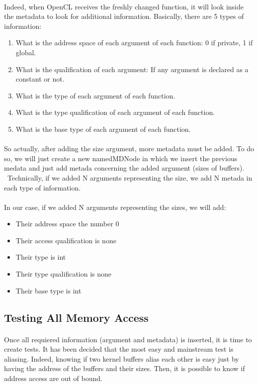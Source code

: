 \documentclass{article}
\begin{document}
\begin{itemize}
\paragraph{}
Indeed, when OpenCL receives the freshly changed function, it will look inside the metadata to look for additional information. Basically, there are 5 types of information:
\begin{enumerate}
\item What is the address space of each argument of each function: 0 if private, 1 if global.
\item What is the qualification of each argument: If any argument is declared as a constant or not.
\item What is the type of each argument of each function.
\item What is the type qualification of each argument of each function.
\item What is the base type of each argument of each function.
\end{enumerate}
\paragraph{}
So actually, after adding the size argument, more metadata must be added. To do so, we will just create a new namedMDNode in which we insert the previous medata and just add metada concerning the added argument (sizes of buffers).
~Technically, if we added N arguments representing the size, we add N metada in each type of information.
\paragraph{}
In our case, if we added N arguments representing the sizes, we will add: 
\begin{itemize}
\item Their address space the number 0
\item Their access qualification is none
\item Their type is int
\item Their type qualification is none
\item Their base type is int
\end{itemize}


\subsection{Testing All Memory Access}
\paragraph{}
Once all requiered information (argument and metadata) is inserted, it is time to create tests. It has been decided that the most easy and mainstream test is aliasing. Indeed, knowing if two kernel buffers alias each other is easy just by having the address of the buffers and their sizes. Then, it is possible to know if address access are out of bound.


\end{itemize}
\end{document}
